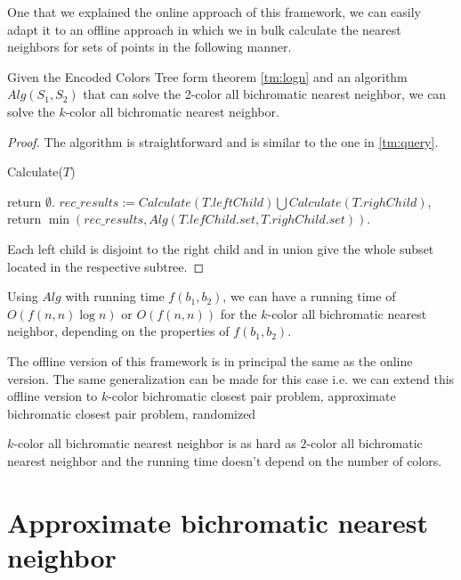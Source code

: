 \documentclass[a4paper,UKenglish,cleveref, autoref, thm-restate]{lipics-v2021}
\begin{document}
One that we explained the online approach of this framework, we can easily adapt it to an offline approach in which we in bulk calculate the nearest neighbors for sets of points in the following manner.

\begin{theorem}[$k\to 2$]\label{tm:k2color}
Given the Encoded Colors Tree form theorem \ref{tm:logn} and an algorithm $Alg(S_1, S_2)$ that can solve the 2-color all bichromatic nearest neighbor, we can solve the $k$-color all bichromatic nearest neighbor.
\end{theorem}
\begin{proof}
The algorithm is straightforward and is similar to the one in \ref{tm:query}.
\begin{algorithm}
\caption{Calculate($T$)}\label{alg:k2color}
\begin{algorithmic}
    \State return $\emptyset$.
    \Else
    \State $rec\_results := Calculate(T.leftChild) \bigcup Calculate(T.righChild)$,
    \State return $\min\left(rec\_results, Alg\left(T.lefChild.set, T.righChild.set\right)\right)$.
    \EndIf
\end{algorithmic}
\end{algorithm}
Each left child is disjoint to the right child and in union give the whole subset located in the respective subtree.
\end{proof}
\begin{remark}
Using $Alg$ with running time $f(b_1,b_2)$, we can have a running time of $O(f(n,n)\log n)$ or $O(f(n,n))$ for the $k$-color all bichromatic nearest neighbor, depending on the properties of $f(b_1,b_2)$.
\end{remark}
The offline version of this framework is in principal the same as the online version.
The same generalization can be made for this case i.e. we can extend this offline version to $k$-color bichromatic closest pair problem, approximate bichromatic closest pair problem, randomized

\begin{corollary}
$k$-color all bichromatic nearest neighbor is as hard as $2$-color all bichromatic nearest neighbor and the running time doesn't depend on the number of colors.
\end{corollary}

\section*{Approximate bichromatic nearest neighbor }
\end{document}
